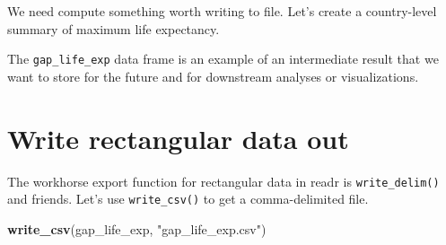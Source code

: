 \documentclass[
]{book}
\newenvironment{Shaded}{\begin{snugshade}}{\end{snugshade}}
\newcommand{\CommentTok}[1]{\textcolor[rgb]{0.56,0.35,0.01}{\textit{#1}}}
\newcommand{\DataTypeTok}[1]{\textcolor[rgb]{0.13,0.29,0.53}{#1}}
\newcommand{\KeywordTok}[1]{\textcolor[rgb]{0.13,0.29,0.53}{\textbf{#1}}}
\newcommand{\NormalTok}[1]{#1}
\newcommand{\OperatorTok}[1]{\textcolor[rgb]{0.81,0.36,0.00}{\textbf{#1}}}
\newcommand{\StringTok}[1]{\textcolor[rgb]{0.31,0.60,0.02}{#1}}
\begin{document}
We need compute something worth writing to file. Let's create a country-level summary of maximum life expectancy.

\begin{Shaded}
\end{Shaded}

The \texttt{gap\_life\_exp} data frame is an example of an intermediate result that we want to store for the future and for downstream analyses or visualizations.

\hypertarget{write-rectangular-data-out}{%
\section{Write rectangular data out}\label{write-rectangular-data-out}}

The workhorse export function for rectangular data in readr is \texttt{write\_delim()} and friends. Let's use \texttt{write\_csv()} to get a comma-delimited file.

\begin{Shaded}
\begin{Highlighting}[]
\KeywordTok{write_csv}\NormalTok{(gap_life_exp, }\StringTok{"gap_life_exp.csv"}\NormalTok{)}
\end{Highlighting}
\end{Shaded}
\end{document}
